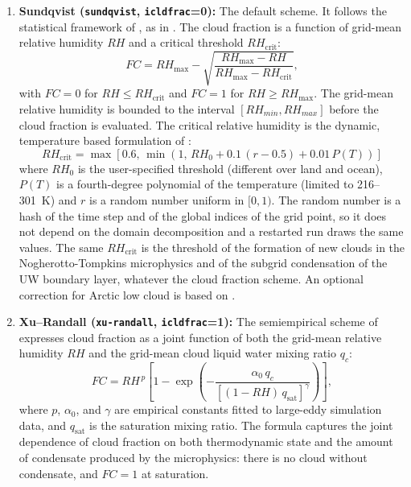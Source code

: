 {{\begin{enumerate}
\item {\bf Sundqvist (\texttt{sundqvist}, \texttt{icldfrac}=0):}
The default scheme. It follows the statistical framework of
\citet{Sundqvist_89}, as in \citet{Pal_00}. The cloud
fraction is a function of grid-mean relative humidity $RH$ and a critical
threshold $RH_\mathrm{crit}$:
\begin{equation}
  FC = RH_\mathrm{max} - \sqrt{\frac{RH_\mathrm{max} - RH}{RH_\mathrm{max} -
       RH_\mathrm{crit}}},
\end{equation}
with $FC = 0$ for $RH \leq RH_\mathrm{crit}$ and $FC = 1$ for $RH \geq
RH_\mathrm{max}$. The grid-mean relative humidity is bounded to the interval
$[RH_{min}, RH_{max}]$ before the cloud fraction is evaluated. The critical
relative humidity is the dynamic, temperature based formulation of
\citet{Wang_25}:
\begin{equation}
  RH_\mathrm{crit} = \max\left[0.6,\,\min\left(1,\,
     RH_0 + 0.1\,(r - 0.5) + 0.01\,P(T)\right)\right]
\end{equation}
where $RH_0$ is the user-specified threshold (different over land and
ocean), $P(T)$ is a fourth-degree polynomial of the temperature (limited to
216--301~K) and $r$ is a random number uniform in $[0,1)$. The random number
is a hash of the time step and of the global indices of the grid point, so
it does not depend on the domain decomposition and a restarted run draws the
same values. The same $RH_\mathrm{crit}$ is the threshold of the formation of
new clouds in the Nogherotto-Tompkins microphysics and of the subgrid
condensation of the UW boundary layer, whatever the cloud fraction scheme.
An optional correction for Arctic low cloud is based on
\citet{Vavrus_08}.\\

\item {\bf Xu--Randall (\texttt{xu-randall}, \texttt{icldfrac}=1):}
The semiempirical scheme of
\citet{xu:96a} expresses cloud fraction as a joint function of both the
grid-mean relative humidity $RH$ and the grid-mean cloud liquid water mixing
ratio $q_c$:
\begin{equation}
  FC = RH^{\,p}\!\left[1 - \exp\!\left(-\frac{\alpha_0\,q_c}
       {\left[(1 - RH)\,q_\mathrm{sat}\right]^{\gamma}}\right)\right],
\end{equation}
where $p$, $\alpha_0$, and $\gamma$ are empirical constants fitted to
large-eddy simulation data, and $q_\mathrm{sat}$ is the saturation mixing
ratio. The formula captures the joint dependence of cloud fraction on both
thermodynamic state and the amount of condensate produced by the
microphysics: there is no cloud without condensate, and $FC = 1$ at
saturation.\\


\end{enumerate}}}
